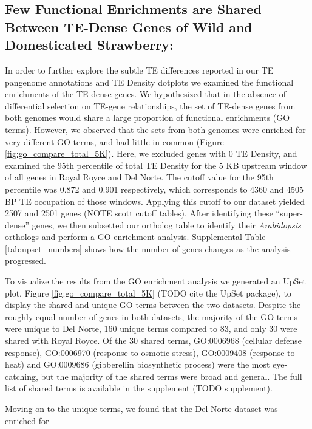 \documentclass[fleqn,10pt]{olplainarticle}
\begin{document}
\subsection{Few Functional Enrichments are Shared Between TE-Dense Genes of Wild and Domesticated Strawberry:} \label{sec:shared_unshared_go}
In order to further explore the subtle TE differences reported in our TE pangenome annotations and TE Density dotplots we examined the functional enrichments of the TE-dense genes.
We hypothesized that in the absence of differential selection on TE-gene relationships, the set of TE-dense genes from both genomes would share a large proportion of functional enrichments (GO terms).
However, we observed that the sets from both genomes were enriched for very different GO terms, and had little in common (Figure \ref{fig:go_compare_total_5K}).
Here, we excluded genes with 0 TE Density, and examined the 95th percentile of total TE Density for the 5 KB upstream window of all genes in Royal Royce and Del Norte.
The cutoff value for the 95th percentile was 0.872 and 0.901 respectively, which corresponds to 4360 and 4505 BP TE occupation of those windows.
Applying this cutoff to our dataset yielded 2507 and 2501 genes (NOTE scott cutoff tables).
After identifying these ``super-dense'' genes, we then subsetted our ortholog table to identify their \textit{Arabidopsis} orthologs and perform a GO enrichment analysis.
Supplemental Table \ref{tab:upset_numbers} shows how the number of genes changes as the analysis progressed.

To visualize the results from the GO enrichment analysis we generated an UpSet plot, Figure \ref{fig:go_compare_total_5K} (TODO cite the UpSet package), to display the shared and unique GO terms between the two datasets.
Despite the roughly equal number of genes in both datasets, the majority of the GO terms were unique to Del Norte, 160 unique terms compared to 83, and only 30 were shared with Royal Royce.
Of the 30 shared terms, GO:0006968 (cellular defense response), GO:0006970 (response to osmotic stress), GO:0009408 (response to heat) and GO:0009686 (gibberellin biosynthetic process) were the most eye-catching, but the majority of the shared terms were broad and general.
The full list of shared terms is available in the supplement (TODO supplement).

Moving on to the unique terms, we found that the Del Norte dataset was enriched for 

\end{document}
